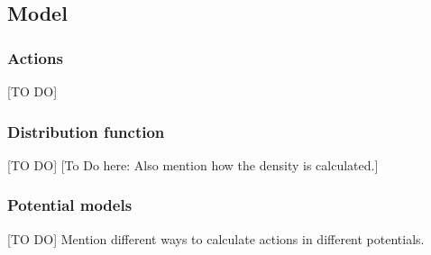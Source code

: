 \subsection{Model}

\subsubsection{Actions}

[TO DO]


\subsubsection{Distribution function} \label{sec:qDF}

[TO DO] [To Do here: Also mention how the density is calculated.]

\subsubsection{Potential models}  \label{sec:potentials}

[TO DO] Mention different ways to calculate actions in different potentials.

